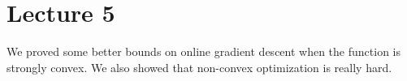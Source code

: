 \section{Lecture 5}
We proved some better bounds on online gradient descent when the function is strongly convex.
We also showed that non-convex optimization is really hard.